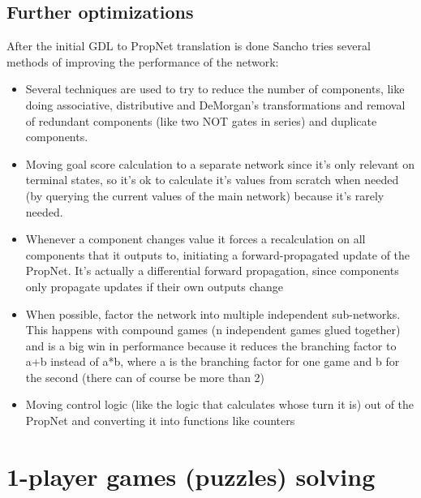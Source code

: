 \subsection{Further optimizations}
After the initial GDL to PropNet translation is done Sancho tries several methods of improving the performance of the network:
\begin{itemize}
	\item Several techniques are used to try to reduce the number of components, like doing associative, distributive and DeMorgan's transformations and removal of redundant components (like two NOT gates in series) and duplicate components.
	
	\item Moving goal score calculation to a separate network since it's only relevant on terminal states, so it's ok to calculate it's values from scratch when needed (by querying the current values of the main network) because it's rarely needed.
	
	\item Whenever a component changes value it forces a recalculation on all components that it outputs to,  initiating a forward-propagated update of the PropNet.
	It's actually a differential forward propagation, since components only propagate updates if their own outputs change
	
	\item When possible, factor the network into multiple independent sub-networks. This happens with compound games (n independent games glued together) and is a big win in performance because it reduces the branching factor to a+b instead of a*b, where a is the branching factor for one game and b for the second (there can of course be more than 2)
	
	\item Moving control logic (like the logic that calculates whose turn it is) out of the PropNet and converting it into functions like counters
	
\end{itemize}



\section{1-player games (puzzles) solving}




